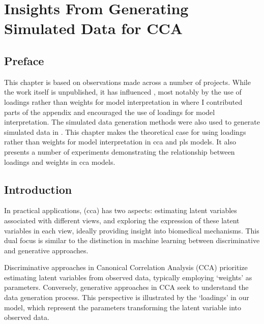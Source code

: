 \graphicspath{{chapters/loadings/}}


\chapter{Insights From Generating Simulated Data for CCA}\label{chap:loadings}
\minitoc
\section*{Preface}

This chapter is based on observations made across a number of projects.
While the work itself is unpublished, it has influenced , most notably by the use of loadings rather than weights for model interpretation in \citet{} where I contributed parts of the appendix and encouraged the use of loadings for model interpretation. The simulated data generation methods were also used to generate simulated data in \citet{mihalik2022canonical}.
This chapter makes the theoretical case for using loadings rather than weights for model interpretation in \acrshort{cca} and \acrshort{pls} models.
It also presents a number of experiments demonstrating the relationship between loadings and weights in \acrshort{cca} models.


\section{Introduction}

In practical applications, (\acrshort{cca}) has two aspects: estimating latent variables associated with different views, and exploring the expression of these latent variables in each view, ideally providing insight into biomedical mechanisms.
This dual focus is similar to the distinction in machine learning between discriminative and generative approaches.

Discriminative approaches in Canonical Correlation Analysis (CCA) prioritize estimating latent variables from observed data, typically employing `weights' as parameters.
Conversely, generative approaches in CCA seek to understand the data generation process.
This perspective is illustrated by the `loadings' in our model, which represent the parameters transforming the latent variable into observed data.

